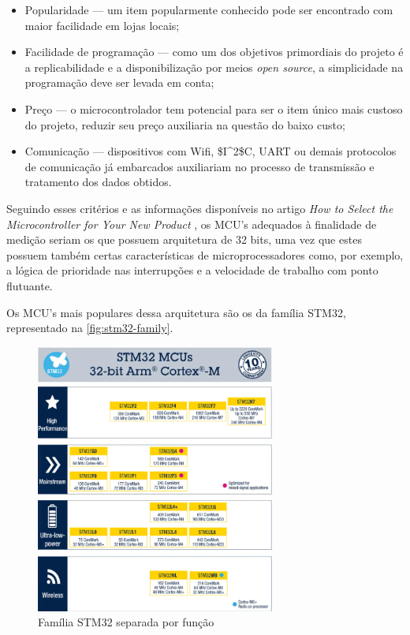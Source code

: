 \begin{itemize}
    \item Popularidade --- um item popularmente conhecido pode ser encontrado com maior facilidade em lojas locais;
    \item Facilidade de programação --- como um dos objetivos primordiais do projeto é a replicabilidade e a disponibilização por meios \textit{open source}, a simplicidade na programação deve ser levada em conta;
    \item Preço --- o microcontrolador tem potencial para ser o item único mais custoso do projeto, reduzir seu preço auxiliaria na questão do baixo custo;
    \item Comunicação --- dispositivos com Wifi, \gls{$I^2$C}, UART ou demais protocolos de comunicação já embarcados auxiliariam no processo de transmissão e tratamento dos dados obtidos.
\end{itemize}

Seguindo esses critérios e as informações disponíveis no artigo \textit{How to Select the Microcontroller for Your New Product} \cite{select_uC}, os \gls{MCU}'s adequados à finalidade de medição seriam os que possuem arquitetura de 32 bits, uma vez que estes possuem também certas características de microprocessadores como, por exemplo, a lógica de prioridade nas interrupções e a velocidade de trabalho com ponto flutuante.

Os \gls{MCU}'s mais populares dessa arquitetura são os da família STM32, representado na \autoref{fig:stm32-family}.

\begin{figure}[htb!]
    \caption{Família STM32 separada por função}
    \label{fig:stm32-family}
    \includegraphics[width=0.7\textwidth]{figuras/STM32-family.png}
\end{figure}

